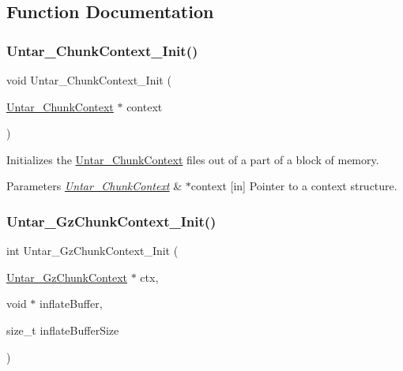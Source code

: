 \subsection{Function Documentation}
\mbox{\label{group__libmisc__untar__img_gadfe0cdaf37c2939553e5babf3b76c6b1}} 
\subsubsection{\texorpdfstring{Untar\_ChunkContext\_Init()}{Untar\_ChunkContext\_Init()}}
{\footnotesize\ttfamily void Untar\+\_\+\+Chunk\+Context\+\_\+\+Init (\begin{DoxyParamCaption}\item[{\mbox{\hyperlink{structUntar__ChunkContext}{Untar\+\_\+\+Chunk\+Context}} $\ast$}]{context }\end{DoxyParamCaption})}



Initializes the \mbox{\hyperlink{structUntar__ChunkContext}{Untar\+\_\+\+Chunk\+Context}} files out of a part of a block of memory. 


\begin{DoxyParams}{Parameters}
{\em \mbox{\hyperlink{structUntar__ChunkContext}{Untar\+\_\+\+Chunk\+Context}}} & $\ast$context \mbox{[}in\mbox{]} Pointer to a context structure. \\
\hline
\end{DoxyParams}
\mbox{\label{group__libmisc__untar__img_ga88650d94dd642342aabc5cfcb7eb01b9}} 
\subsubsection{\texorpdfstring{Untar\_GzChunkContext\_Init()}{Untar\_GzChunkContext\_Init()}}
{\footnotesize\ttfamily int Untar\+\_\+\+Gz\+Chunk\+Context\+\_\+\+Init (\begin{DoxyParamCaption}\item[{\mbox{\hyperlink{structUntar__GzChunkContext}{Untar\+\_\+\+Gz\+Chunk\+Context}} $\ast$}]{ctx,  }\item[{void $\ast$}]{inflate\+Buffer,  }\item[{size\+\_\+t}]{inflate\+Buffer\+Size }\end{DoxyParamCaption})}



